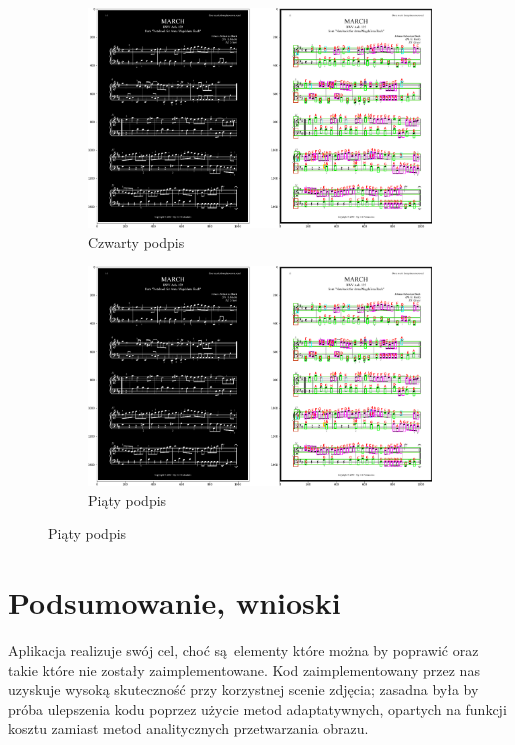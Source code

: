 \documentclass[12pt]{article}
\begin{document}
\begin{figure}[h!]
	\begin{subfigure}[b]{0.48\linewidth}
		\includegraphics[width=\linewidth]{zdjs/Zdj0.png}
		\caption{Czwarty podpis}
	\end{subfigure}
	\begin{subfigure}[b]{0.48\linewidth}
		\includegraphics[width=\linewidth]{zdjs/Zdj0.png}
		\caption{Piąty podpis}
	\end{subfigure}
\end{figure}

\section{Podsumowanie, wnioski}
Aplikacja realizuje swój cel, choć są elementy które można by poprawić oraz takie które nie zostały zaimplementowane. Kod zaimplementowany przez nas uzyskuje wysoką skuteczność przy korzystnej scenie zdjęcia; zasadna była by próba ulepszenia kodu poprzez użycie metod adaptatywnych, opartych na funkcji kosztu zamiast metod analitycznych przetwarzania obrazu.
\end{document}
